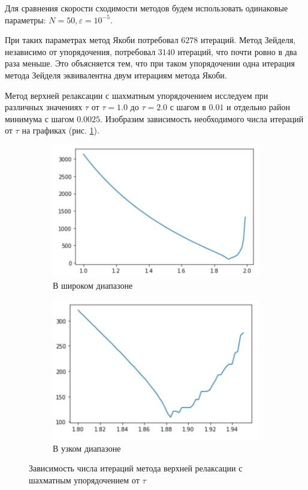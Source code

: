 \documentclass[report , a4paper, onecolumn, 12pt]{article}
\begin{document}
Для сравнения скорости сходимости методов будем использовать одинаковые параметры: $N = 50, \varepsilon = 10^{-5}$.

При таких параметрах метод Якоби потребовал $6278$ итераций. Метод Зейделя, независимо от упорядочения, потребовал $3140$ итераций, что почти ровно в два раза меньше. Это объясняется тем, что при таком упорядочении одна итерация метода Зейделя эквивалентна двум итерациям метода Якоби. 

Метод верхней релаксации с шахматным упорядочением исследуем при различных значениях $\tau$ от $\tau = 1.0$ до $\tau = 2.0$ с шагом в $0.01$ и отдельно район минимума с шагом $0.0025$. Изобразим зависимость необходимого числа итераций от $\tau$ на графиках (рис. \ref{fig:taus_chess}).

\begin{figure}[]
    \centering
    \begin{subfigure}{0.5\textwidth}
    \includegraphics[width=1\textwidth]{taus_chess1}
    \caption{В широком диапазоне}
    \end{subfigure}%
    \begin{subfigure}{0.5\textwidth}
    \includegraphics[width=1\textwidth]{taus_chess2}
    \caption{В узком диапазоне}
    \end{subfigure}
    \caption{Зависимость числа итераций метода верхней релаксации с шахматным упорядочением от $\tau$}
    \label{fig:taus_chess}
\end{figure}
\end{document}
